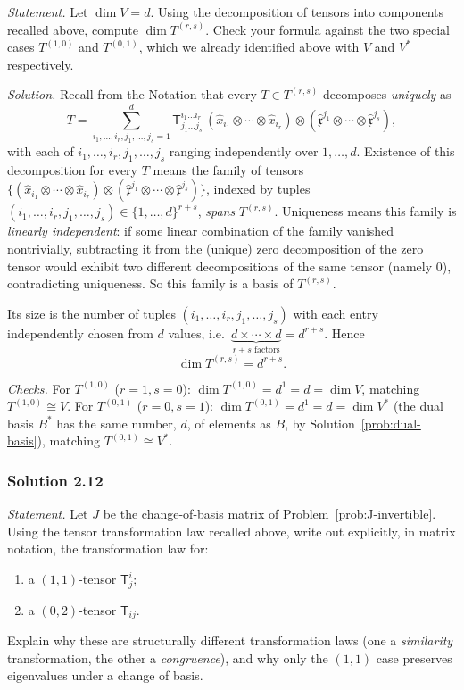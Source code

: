 \documentclass[11pt]{article}
\newcommand{\dual}{V^{*}}
\begin{document}
\noindent\textit{Statement.} Let $\dim V = d$. Using the decomposition of tensors into components recalled above, compute $\dim T^{(r,s)}$. Check your formula against the two special cases $T^{(1,0)}$ and $T^{(0,1)}$, which we already identified above with $V$ and $\dual$ respectively.

\medskip
\noindent\textit{Solution.} Recall from the Notation that every $T\in T^{(r,s)}$ decomposes \emph{uniquely} as
\[
T=\sum_{i_1,\dots,i_r,j_1,\dots,j_s=1}^d \mathsf T^{i_1\dots i_r}_{j_1\dots j_s}\,(\hat x_{i_1}\otimes\cdots\otimes\hat x_{i_r})\otimes(\hat{\mathfrak x}^{j_1}\otimes\cdots\otimes\hat{\mathfrak x}^{j_s}),
\]
with each of $i_1,\dots,i_r,j_1,\dots,j_s$ ranging independently over $1,\dots,d$. Existence of this decomposition for every $T$ means the family of tensors $\{(\hat x_{i_1}\otimes\cdots\otimes\hat x_{i_r})\otimes(\hat{\mathfrak x}^{j_1}\otimes\cdots\otimes\hat{\mathfrak x}^{j_s})\}$, indexed by tuples $(i_1,\dots,i_r,j_1,\dots,j_s)\in\{1,\dots,d\}^{r+s}$, \emph{spans} $T^{(r,s)}$. Uniqueness means this family is \emph{linearly independent}: if some linear combination of the family vanished nontrivially, subtracting it from the (unique) zero decomposition of the zero tensor would exhibit two different decompositions of the same tensor (namely $0$), contradicting uniqueness. So this family is a basis of $T^{(r,s)}$.

Its size is the number of tuples $(i_1,\dots,i_r,j_1,\dots,j_s)$ with each entry independently chosen from $d$ values, i.e.\ $\underbrace{d\times\cdots\times d}_{r+s\text{ factors}}=d^{r+s}$. Hence
\[
\dim T^{(r,s)} = d^{r+s}.
\]

\emph{Checks.} For $T^{(1,0)}$ ($r=1,s=0$): $\dim T^{(1,0)}=d^1=d=\dim V$, matching $T^{(1,0)}\cong V$. For $T^{(0,1)}$ ($r=0,s=1$): $\dim T^{(0,1)}=d^1=d=\dim\dual$ (the dual basis $B^*$ has the same number, $d$, of elements as $B$, by Solution~\ref{prob:dual-basis}), matching $T^{(0,1)}\cong\dual$.

\subsubsection*{Solution 2.12}

\noindent\textit{Statement.} Let $J$ be the change-of-basis matrix of Problem~\ref{prob:J-invertible}. Using the tensor transformation law recalled above, write out explicitly, in matrix notation, the transformation law for:
\begin{enumerate}[label=(\alph*)]
  \item a $(1,1)$-tensor $\mathsf{T}^i_j$;
  \item a $(0,2)$-tensor $\mathsf{T}_{ij}$.
\end{enumerate}
Explain why these are structurally different transformation laws (one a \emph{similarity} transformation, the other a \emph{congruence}), and why only the $(1,1)$ case preserves eigenvalues under a change of basis.
\end{document}
